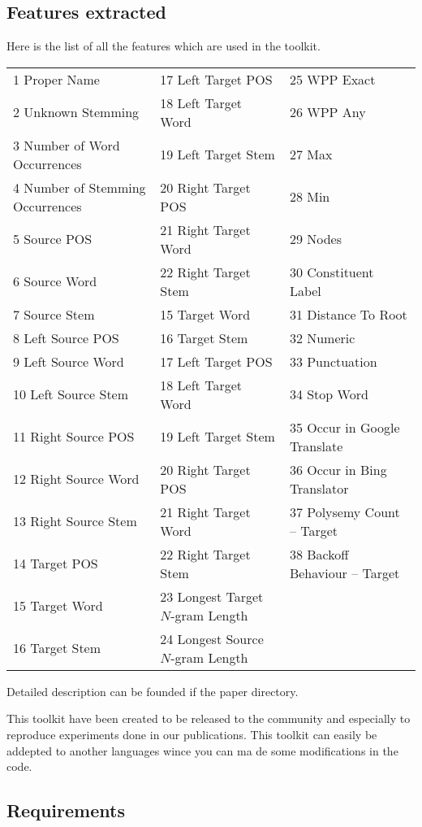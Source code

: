 \documentclass[a4paper,12pt]{article}
\begin{document}
\subsection{Features extracted}
Here is the list of all the features which are used in the toolkit.
\begin{table}[h!]
\scriptsize
\centering
\begin{tabular}{|l|l|l|}
\hline
1 Proper Name & 17 Left Target POS & 25 WPP Exact \\
2 Unknown Stemming & 18 Left Target Word & 26 WPP Any \\
3 Number of Word Occurrences & 19 Left Target Stem & 27 Max \\
4 Number of Stemming Occurrences & 20 Right Target POS & 28 Min \\
5 Source POS & 21 Right Target Word & 29 Nodes \\
6 Source Word & 22 Right Target Stem & 30 Constituent Label \\
7 Source Stem & 15 Target Word & 31 Distance To Root \\
8 Left Source POS & 16 Target Stem & 32 Numeric \\
9 Left Source Word & 17 Left Target POS & 33 Punctuation \\
10 Left Source Stem & 18 Left Target Word & 34 Stop Word \\
11 Right Source POS & 19 Left Target Stem & 35 Occur in Google Translate \\
12 Right Source Word & 20 Right Target POS & 36 Occur in Bing Translator \\
13 Right Source Stem & 21 Right Target Word & 37 Polysemy Count -- Target \\
14 Target POS & 22 Right Target Stem & 38 Backoff Behaviour -- Target \\
15 Target Word & 23 Longest Target $N$-gram Length &  \\
16 Target Stem & 24 Longest Source $N$-gram Length &  \\
\hline
\end{tabular}
\end{table}
Detailed description can be founded if the paper directory.


This toolkit have been created to be released to the community and especially to reproduce experiments done in our publications.
This toolkit can easily be addepted to another languages wince you can ma de some modifications in the code.

\subsection{Requirements}
\end{document}
